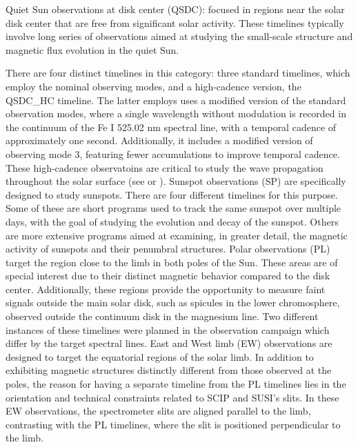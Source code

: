 \begin{itemize}
  \Myitem Quiet Sun observations at disk center (QSDC): focused in regions near the solar disk center that are free from significant solar activity. These timelines typically involve long series of observations aimed at studying the small-scale structure and magnetic flux evolution in the quiet Sun. 
  
  There are four distinct timelines in this category: three standard timelines, which employ the nominal observing modes, and a high-cadence version, the QSDC{\_}HC timeline. The latter employs uses a modified version of the standard observation modes, where a single wavelength without modulation is recorded in the continuum of the Fe I 525.02 nm spectral line, with a temporal cadence of approximately one second. Additionally, it includes a modified version of observing mode 3, featuring fewer accumulations to improve temporal cadence. These high-cadence observatoins are critical to study the wave propagation throughout the solar surface (see \citealt{acoustic-waves} or \citealt{acoustic-waves-2}).    
  \Myitem Sunspot observations (SP) are specifically designed to study sunspots. There are four different timelines for this purpose. Some of these are short programs used to track the same sunspot over multiple days, with the goal of studying the evolution and decay of the sunspot. Others are more extensive programs aimed at examining, in greater detail, the magnetic activity of sunspots and their penumbral structures.
  \Myitem Polar observations (PL) target the region close to the limb in both poles of the Sun. These areas are of special interest due to their distinct magnetic behavior compared to the disk center. Additionally, these regions provide the opportunity to measure faint signals outside the main solar disk, such as spicules in the lower chromosphere, observed outside the continuum disk in the magnesium line. Two different instances of these timelines were planned in the observation campaign which differ by the target spectral lines.
  \Myitem East and West limb (EW) observations are designed to target the equatorial regions of the solar limb. In addition to exhibiting magnetic structures distinctly different from those observed at the poles, the reason for having a separate timeline from the PL timelines lies in the orientation and technical constraints related to SCIP and SUSI's slits. In these EW observations, the spectrometer slits are aligned parallel to the limb, contrasting with the PL timelines, where the slit is positioned perpendicular to the limb.

\end{itemize}
